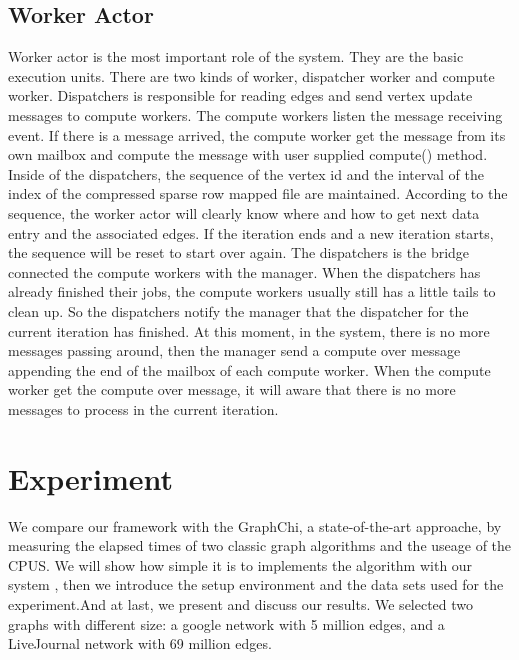 \documentclass[twocolumn,a4paper,10pt]{article}
\begin{document}
\subsection{Worker Actor}
Worker actor is the most important role of the system. They are the basic execution units. There are two kinds of worker, dispatcher worker and compute worker. Dispatchers is responsible for reading edges and send vertex update messages to compute workers. The compute workers listen the message receiving event. If there is a message arrived, the compute worker get the message from its own mailbox and compute the message with user supplied compute() method.
Inside of the dispatchers, the sequence of the vertex id and the interval of the index of the compressed sparse row mapped file are maintained. According to the sequence, the worker actor will clearly know where and how to get next data entry and the associated edges. If the iteration ends and a new iteration starts, the sequence will be reset to start over again. 
The dispatchers is the bridge connected the compute workers with the manager. When the dispatchers has already finished their jobs, the compute workers usually still has a little tails to clean up. So the dispatchers notify the manager that the dispatcher for the current iteration has finished. At this moment, in the system, there is no more messages passing around, then the manager send a compute over message appending the end of the mailbox of each compute worker. When the compute worker get the compute over message, it will aware that there is no more messages to process in the current iteration.

\section{Experiment}
We compare our framework with the GraphChi, a state-of-the-art approache, by measuring the elapsed times of two classic graph algorithms and the useage of the CPUS. We will show how simple it is to implements the algorithm with our system , then we introduce the setup environment and the data sets used for the experiment.And at last, we present and discuss our results. We selected two graphs with different size: a google network with 5 million edges, and a LiveJournal network with 69 million edges. 
\end{document}
